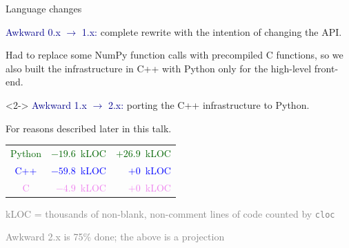 \documentclass[aspectratio=169]{beamer}
\begin{document}
\begin{frame}{Language changes}
\large
\vspace{0.5 cm}

\textcolor{darkblue}{Awkward 0.x $\to$ 1.x:} complete rewrite with the intention of changing the API.

\vspace{0.25 cm}
Had to replace some NumPy function calls with precompiled C functions, so we also built the infrastructure in C++ with Python only for the high-level front-end.

\vspace{1 cm}
\begin{uncoverenv}<2->
\textcolor{darkblue}{Awkward 1.x $\to$ 2.x:} porting the C++ infrastructure to Python.

\vspace{0.25 cm}
For reasons described later in this talk.

\vspace{0.25 cm}
\begin{center}
\begin{tabular}{c r r}
\textcolor{darkgreen}{Python} & \textcolor{darkgreen}{$-19.6$~kLOC} & \textcolor{darkgreen}{$+26.9$~kLOC} \\
\textcolor{blue}{C++} & \textcolor{blue}{$-59.8$~kLOC} & \textcolor{blue}{$+0$~kLOC} \\
\textcolor{violet}{C} & \textcolor{violet}{$-4.9$~kLOC} & \textcolor{violet}{$+0$~kLOC} \\
\end{tabular}

\vspace{0.25 cm}
\textcolor{gray}{\scriptsize kLOC = thousands of non-blank, non-comment lines of code counted by \texttt{cloc}}

\textcolor{gray}{\scriptsize Awkward 2.x is 75\% done; the above is a projection}
\end{center}
\end{uncoverenv}
\end{frame}
\end{document}
